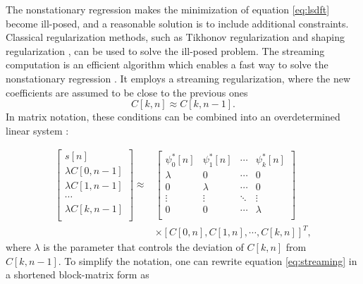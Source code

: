 The nonstationary regression makes the minimization of
equation \ref{eq:lsdft} become ill-posed, and a reasonable solution is
to include additional constraints. Classical regularization methods,
such as Tikhonov regularization \cite[]{Tikhonov63} and shaping
regularization \cite[]{Fomel07b,Liu13,chen2021}, can be used to solve
the ill-posed problem. The streaming computation is an efficient
algorithm which enables a fast way to solve the nonstationary
regression \cite[]{Fomel16,Geng24,Fomel24}. It employs a streaming
regularization, where the new coefficients are assumed to be close to
the previous ones
\begin{equation}
    \label{eq:approx}
    C[k,n] \approx C[k,n-1].
\end{equation}
In matrix notation, these conditions can be combined into an
overdetermined linear system \cite[]{Fomel16,Fomel24}:

\begin{equation}
		\begin{aligned}
			\label{eq:streaming}
            \left[
			\begin{array}{c}
				s[n]\\
				\lambda C[0,n-1]\\\lambda C[1,n-1]\\
				\cdots \\
				\lambda C[k,n-1]\\
			\end{array}
			\right] 
			\approx&\left[
			\begin{array}{cccc}
				\psi^{*}_0[n]  & \psi^{*}_1[n] & \cdots & \psi^{*}_k[n]\\
				\lambda & 0 & \cdots & 0\\
				0 & \lambda & \cdots & 0\\
				\vdots   & \vdots  & \ddots  & \vdots \\
				0 & 0 & \cdots & \lambda\\
			\end{array}
			\right]\\
			&\times \left[
			C[0,n], C[1,n], \cdots, C[k,n]
			\right]^T,
		\end{aligned}
	\end{equation}
where $\lambda$ is the parameter that controls the deviation of
$C[k,n]$ from $C[k,n-1]$. To simplify the notation, one can rewrite
equation \ref{eq:streaming} in a shortened block-matrix form as

